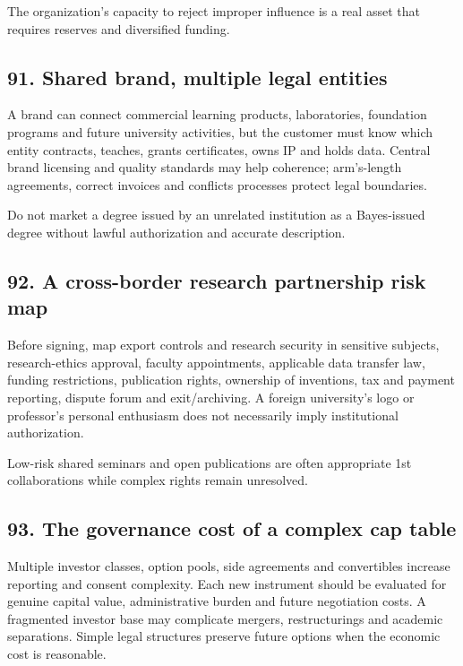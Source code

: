 The organization's capacity to reject improper influence is a real asset that requires reserves and diversified funding.

\subsection{91. Shared brand, multiple legal entities}

A brand can connect commercial learning products, laboratories, foundation programs and future university activities, but the customer must know which entity contracts, teaches, grants certificates, owns IP and holds data. Central brand licensing and quality standards may help coherence; arm's-length agreements, correct invoices and conflicts processes protect legal boundaries.

Do not market a degree issued by an unrelated institution as a Bayes-issued degree without lawful authorization and accurate description.

\subsection{92. A cross-border research partnership risk map}

Before signing, map export controls and research security in sensitive subjects, research-ethics approval, faculty appointments, applicable data transfer law, funding restrictions, publication rights, ownership of inventions, tax and payment reporting, dispute forum and exit/archiving. A foreign university's logo or professor's personal enthusiasm does not necessarily imply institutional authorization.

Low-risk shared seminars and open publications are often appropriate 1st collaborations while complex rights remain unresolved.

\subsection{93. The governance cost of a complex cap table}

Multiple investor classes, option pools, side agreements and convertibles increase reporting and consent complexity. Each new instrument should be evaluated for genuine capital value, administrative burden and future negotiation costs. A fragmented investor base may complicate mergers, restructurings and academic separations. Simple legal structures preserve future options when the economic cost is reasonable.

